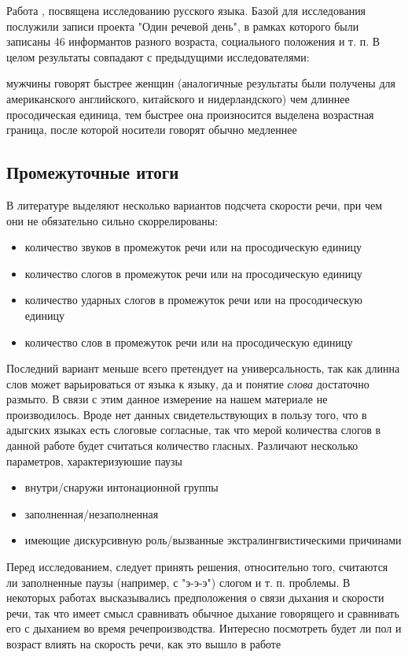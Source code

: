 \par \citep{quene08}
\par \citep{hilton11}
\par Работа \citep{stepanova11}, посвящена исследованию русского языка. Базой для исследования послужили записи проекта "Один речевой день", в рамках которого были записаны 46 информантов разного возраста, социального положения и т. п. В целом результаты совпадают с предыдущими исследователями:
\begin{itemize}
\mytem мужчины говорят быстрее женщин (аналогичные результаты были получены для американского английского, китайского и нидерландского)
\mytem чем длиннее просодическая единица, тем быстрее она произносится
\mytem выделена возрастная граница, после которой носители говорят обычно медленнее
\end{itemize}
\par \citep{kendall13}
\par \citep{bosker15}
\par \citep{bosker16}
\pagebreak
\subsection{Промежуточные итоги}
\begin{itemize}
\mytem В литературе выделяют несколько вариантов подсчета скорости речи, при чем они не обязательно сильно скоррелированы:
\begin{itemize}
\item количество звуков в промежуток речи или на просодическую единицу
\item количество слогов в промежуток речи или на просодическую единицу
\item количество ударных слогов в промежуток речи или на просодическую единицу
\item количество слов в промежуток речи или на просодическую единицу
\end{itemize}
Последний вариант меньше всего претендует на универсальность, так как длинна слов может варьироваться от языка к языку, да и понятие \textit{слова} достаточно размыто. В связи с этим данное измерение на нашем материале не производилось.
\mytem Вроде нет данных свидетельствующих в пользу того, что в адыгских языках есть слоговые согласные, так что мерой количества слогов в данной работе будет считаться количество гласных.
\mytem Различают несколько параметров, характеризуюшие паузы
\begin{itemize}
\item внутри/снаружи интонационной группы
\item заполненная/незаполненная
\item имеющие дискурсивную роль/вызванные экстралингвистическими причинами
\end{itemize}
Перед исследованием, следует принять решения, относительно того, считаются ли заполненные паузы (например, с "э-э-э") слогом и т. п. проблемы.
\mytem В некоторых работах высказывались предположения о связи дыхания и скорости речи, так что имеет смысл сравнивать обычное дыхание говорящего и сравнивать его с дыханием во время речепроизводства.
\mytem Интересно посмотреть будет ли пол и возраст влиять на скорость речи, как это вышло в работе \citep{stepanova11}
\end{itemize}

